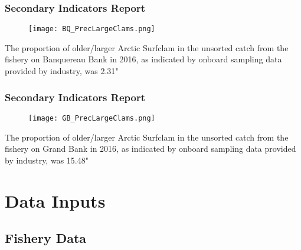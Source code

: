 \documentclass{beamer}
\begin{document}
\begin{frame}
\frametitle{Secondary Indicators Report}
\begin{figure}
        \begin{center}
            \texttt{[image: BQ\_PrecLargeClams.png]}
        \end{center}
    \end{figure}

The proportion of older/larger Arctic Surfclam in the unsorted catch from the fishery on Banquereau Bank in 2016, as indicated by onboard sampling data provided by industry, was 2.31"%
\end{frame}



\begin{frame}
\frametitle{Secondary Indicators Report}
\begin{figure}
        \begin{center}
            \texttt{[image: GB\_PrecLargeClams.png]}
        \end{center}
    \end{figure}

The proportion of older/larger Arctic Surfclam in the unsorted catch from the fishery on Grand Bank in 2016, as indicated by onboard sampling data provided by industry, was 15.48"%
\end{frame}



\section{Data Inputs}
\subsection{Fishery Data}
\end{document}
